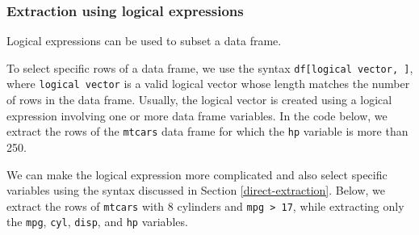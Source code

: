 \documentclass[
]{book}
\newenvironment{Shaded}{\begin{snugshade}}{\end{snugshade}}
\newcommand{\CommentTok}[1]{\textcolor[rgb]{0.56,0.35,0.01}{\textit{#1}}}
\newcommand{\DecValTok}[1]{\textcolor[rgb]{0.00,0.00,0.81}{#1}}
\newcommand{\DocumentationTok}[1]{\textcolor[rgb]{0.56,0.35,0.01}{\textbf{\textit{#1}}}}
\newcommand{\FunctionTok}[1]{\textcolor[rgb]{0.00,0.00,0.00}{#1}}
\newcommand{\NormalTok}[1]{#1}
\newcommand{\SpecialCharTok}[1]{\textcolor[rgb]{0.00,0.00,0.00}{#1}}
\newcommand{\StringTok}[1]{\textcolor[rgb]{0.31,0.60,0.02}{#1}}
\theoremstyle{definition}
\theoremstyle{definition}
\theoremstyle{definition}
\theoremstyle{definition}
\theoremstyle{remark}
\begin{document}
\hypertarget{extraction-using-logical-expressions}{%
\subsubsection{Extraction using logical expressions}\label{extraction-using-logical-expressions}}

Logical expressions can be used to subset a data frame.

To select specific rows of a data frame, we use the syntax \texttt{df{[}logical\ vector,\ {]}}, where \texttt{logical\ vector} is a valid logical vector whose length matches the number of rows in the data frame. Usually, the logical vector is created using a logical expression involving one or more data frame variables. In the code below, we extract the rows of the \texttt{mtcars} data frame for which the \texttt{hp} variable is more than 250.

\begin{Shaded}
\end{Shaded}

We can make the logical expression more complicated and also select specific variables using the syntax discussed in Section \ref{direct-extraction}. Below, we extract the rows of \texttt{mtcars} with 8 cylinders and \texttt{mpg\ \textgreater{}\ 17}, while extracting only the \texttt{mpg}, \texttt{cyl}, \texttt{disp}, and \texttt{hp} variables.

\begin{Shaded}
\end{Shaded}
\end{document}
